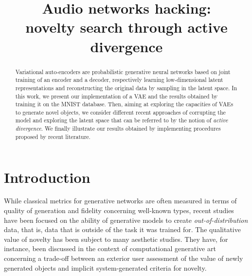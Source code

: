 \documentclass{article}
\title{Audio networks hacking:\\ novelty search through active divergence}
\begin{document}
%
\maketitle
%





\begin{abstract}
Variational auto-encoders are probabilistic generative neural networks based on joint training of an encoder and a decoder, respectively learning low-dimensional latent representations and reconstructing the original data by sampling in the latent space.
In this work, we present our implementation of a VAE and the results obtained by training it on the MNIST database.
Then, aiming at exploring the capacities of VAEs to generate novel objects, we consider different recent approaches of corrupting the model and exploring the latent space that can be referred to by the notion of \emph{active divergence}. We finally illustrate our results obtained by implementing procedures proposed by recent literature.
\end{abstract}




\section{Introduction}
While classical metrics for generative networks are often measured in terms of quality of generation and fidelity concerning well-known types, recent studies have been focused on the ability of generative models to create \emph{out-of-distribution} data, that is, data that is outside of the task it was trained for.
The qualitative value of novelty has been subject to many aesthetic studies.
They have, for instance, been discussed in the context of computational generative art concerning a trade-off between an exterior user assessment of the value of newly generated objects and implicit system-generated criteria for novelty. 
\end{document}
